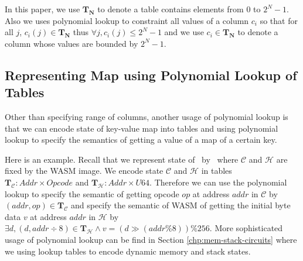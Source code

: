 In this paper, we use $\mathbf{T_N}$ to denote a table contains elements from $0$ to $2^N-1$. Also we uses polynomial lookup to constraint all values of a column $c_i$ so that for all $j$, $c_i(j) \in \mathbf{T_N}$ thus $\forall j, c_i(j) \le 2^N-1$ and we use $c_i \in \mathbf{T_N}$ to denote a column whose values are bounded by $2^N - 1$.

\subsection{Representing Map using Polynomial Lookup of Tables}
\label{chp:map-repr}
Other than specifying range of columns, another usage of polynomial lookup is that we can encode state of key-value map into tables and using polynomial lookup to specify the semantics of getting a value of a map of a certain key. 

Here is an example. Recall that we represent state of \zkwasm\, by \fullstate \, where $\mathcal{C}$ and $\mathcal{H}$ are fixed by the WASM image. We encode state $\mathcal{C}$ and $\mathcal{H}$ in tables $\mathbf{T}_\mathcal{C} : Addr \times Opcode$ and $\mathbf{T}_\mathcal{H}: Addr \times U64$. Therefore we can use the polynomial lookup to specify the semantic of getting opcode $op$ at address $addr$ in $\mathcal{C}$ by $(addr, op) \in \mathbf{T}_\mathcal{C}$ and specify the semantic of WASM of getting the initial byte data $v$ at address $addr$ in $\mathcal{H}$ by $\exists d, (d, addr \div 8) \in \mathbf{T}_\mathcal{H} \wedge v = (d \gg (addr \% 8)) \% 256$. More sophisticated usage of polynomial lookup can be find in Section \ref{chp:mem-stack-circuits} where we using lookup tables to encode dynamic memory and stack states.


